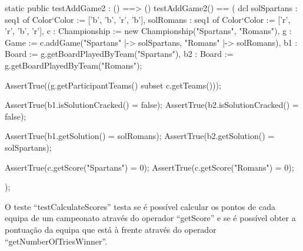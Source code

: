 \begin{vdm_al}  
    static public testAddGame2 : () ==> ()
    testAddGame2() ==
      ( dcl solSpartans : seq1 of Color`Color := ['b', 'b', 'r', 'b'],
        solRomans : seq1 of Color`Color := ['r', 'r', 'b', 'r'],
        c : Championship := new Championship({"Spartans", "Romans"}),
        g : Game := c.addGame({"Spartans" |-> solSpartans, "Romans" |-> solRomans}),
        b1 : Board := g.getBoardPlayedByTeam("Spartans"),
        b2 : Board := g.getBoardPlayedByTeam("Romans");
  
        AssertTrue((g.getParticipantTeams() subset c.getTeams()));
  
        AssertTrue(b1.isSolutionCracked() = false);
        AssertTrue(b2.isSolutionCracked() = false);
  
        AssertTrue(b1.getSolution() = solRomans);
        AssertTrue(b2.getSolution() = solSpartans);
  
        AssertTrue(c.getScore("Spartans") = 0);
        AssertTrue(c.getScore("Romans") = 0);
  
      );
\end{vdm_al}  

O teste ``testCalculateScores'' testa se é possível calcular os pontos
de cada equipa de um campeonato através do operador ``getScore'' e se
é possível obter a pontuação da equipa que está à frente através do
operador ``getNumberOfTriesWinner''.

